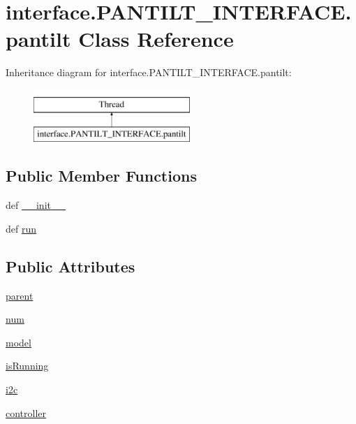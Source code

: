 \hypertarget{classinterface_1_1PANTILT__INTERFACE_1_1pantilt}{}\section{interface.\+P\+A\+N\+T\+I\+L\+T\+\_\+\+I\+N\+T\+E\+R\+F\+A\+C\+E.\+pantilt Class Reference}
\label{classinterface_1_1PANTILT__INTERFACE_1_1pantilt}
Inheritance diagram for interface.\+P\+A\+N\+T\+I\+L\+T\+\_\+\+I\+N\+T\+E\+R\+F\+A\+C\+E.\+pantilt\+:\begin{figure}[H]
\begin{center}
\leavevmode
\includegraphics[height=2.000000cm]{classinterface_1_1PANTILT__INTERFACE_1_1pantilt}
\end{center}
\end{figure}
\subsection*{Public Member Functions}
\begin{DoxyCompactItemize}
\item 
def \hyperlink{classinterface_1_1PANTILT__INTERFACE_1_1pantilt_aa7d020e58aa179449247b1f13633fad5}{\+\_\+\+\_\+init\+\_\+\+\_\+}
\item 
def \hyperlink{classinterface_1_1PANTILT__INTERFACE_1_1pantilt_a392fb49d4df58462baeece46745f43f7}{run}
\end{DoxyCompactItemize}
\subsection*{Public Attributes}
\begin{DoxyCompactItemize}
\item 
\hyperlink{classinterface_1_1PANTILT__INTERFACE_1_1pantilt_a4442738a7ee24df1e8c6e95164ae9544}{parent}
\item 
\hyperlink{classinterface_1_1PANTILT__INTERFACE_1_1pantilt_a17986d3dabe0004cc86452d4d421059f}{num}
\item 
\hyperlink{classinterface_1_1PANTILT__INTERFACE_1_1pantilt_a77c1550064e91d0db075dea7c9aa9a90}{model}
\item 
\hyperlink{classinterface_1_1PANTILT__INTERFACE_1_1pantilt_a08bc9b59792cb71a7c7f167fd6ae5d85}{is\+Running}
\item 
\hyperlink{classinterface_1_1PANTILT__INTERFACE_1_1pantilt_a091704dbc6e8f320a8bf165627ddf915}{i2c}
\item 
\hyperlink{classinterface_1_1PANTILT__INTERFACE_1_1pantilt_a38bb4cf26d92df42d52715872377cdef}{controller}
\end{DoxyCompactItemize}


